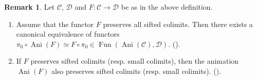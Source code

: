 \documentclass[11pt, a4paper]{amsart}
\theoremstyle{plain}
\theoremstyle{definition}
\newtheorem{remark}[theorem]{Remark}
\begin{document}
\begin{remark}\label{rem3.12} 
Let $\mathscr C$, $\mathscr D$ and $F:\mathscr C\to \mathscr D$ be as in the above definition.
    \begin{enumerate}
        \item Assume that the functor $F$ preserves all sifted colimits. Then there exists a canonical equivalence of functors $\pi_0\circ \operatorname{Ani}(F)\simeq F\circ \pi_0\in \operatorname{Fun}(\operatorname{Ani}(\mathscr C),\mathscr D)$. (\cite[Subsection 5.1.4]{CS24}).
        \item If $F$ preserves sifted colimits (resp. small colimits), then the animation $\operatorname{Ani}(F)$ also preserves sifted colimits (resp. small colimits). (\cite[Corollary A.25]{Mao24}).
    \end{enumerate}
\end{remark}
\end{document}
